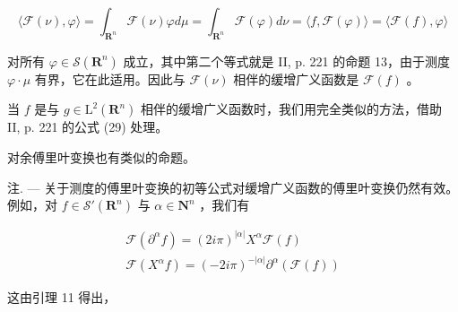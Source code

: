 \[
\langle \mathcal {F} (\nu), \varphi \rangle = \int_ {\mathbf {R} ^ {n}} \mathcal {F} (\nu) \varphi d \mu = \int_ {\mathbf {R} ^ {n}} \mathcal {F} (\varphi) d \nu = \langle f, \mathcal {F} (\varphi) \rangle = \langle \mathcal {F} (f), \varphi \rangle
\]

对所有 \(\varphi\in\mathcal{S}(\mathbf{R}^{n})\) 成立，其中第二个等式就是 II, p. 221 的命题 13，由于测度 \(\varphi\cdot\mu\) 有界，它在此适用。因此与 \(\mathcal{F}(\nu)\) 相伴的缓增广义函数是 \(\mathcal{F}(f)\) 。

当 \(f\) 是与 \(g \in \mathrm{L}^2(\mathbf{R}^n)\) 相伴的缓增广义函数时，我们用完全类似的方法，借助 II, p. 221 的公式 (29) 处理。

对余傅里叶变换也有类似的命题。

注. --- 关于测度的傅里叶变换的初等公式对缓增广义函数的傅里叶变换仍然有效。例如，对 \(f \in \mathcal{S}'(\mathbf{R}^{n})\) 与 \(\alpha \in \mathbf{N}^{n}\) ，我们有

\[
\begin{array}{l} \mathcal {F} (\partial^ {\alpha} f) = (2 i \pi) ^ {| \alpha |} X ^ {\alpha} \mathcal {F} (f) \\ \mathcal {F} (X ^ {\alpha} f) = (- 2 i \pi) ^ {- | \alpha |} \partial^ {\alpha} (\mathcal {F} (f)) \end{array}
\]

这由引理 11 得出，

